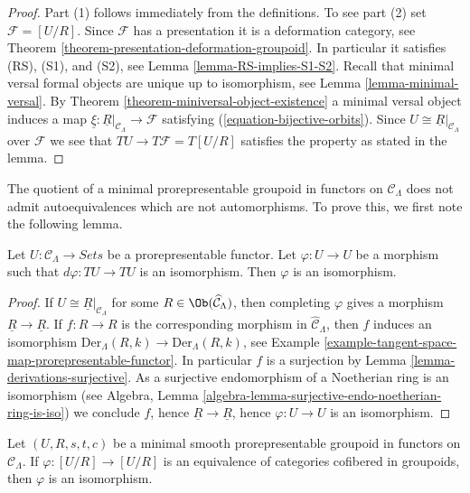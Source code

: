 \begin{proof}
Part (1) follows immediately from the definitions.
To see part (2) set $\mathcal{F} = [U/R]$. Since $\mathcal{F}$
has a presentation it is a deformation category, see
Theorem \ref{theorem-presentation-deformation-groupoid}.
In particular it satisfies (RS), (S1), and (S2), see
Lemma \ref{lemma-RS-implies-S1-S2}.
Recall that minimal versal formal objects are unique up to isomorphism, see
Lemma \ref{lemma-minimal-versal}.
By
Theorem \ref{theorem-miniversal-object-existence}
a minimal versal object induces a map
$\underline{\xi} : \underline{R}|_{\mathcal{C}_\Lambda} \to \mathcal{F}$
satisfying (\ref{equation-bijective-orbits}). Since
$U \cong \underline{R}|_{\mathcal{C}_\Lambda}$ over $\mathcal{F}$
we see that $TU \to T\mathcal{F} = T[U/R]$ satisfies the property
as stated in the lemma.
\end{proof}

\noindent
The quotient of a minimal prorepresentable groupoid in functors on $\mathcal
C_\Lambda$ does not admit autoequivalences which are not automorphisms.  To
prove this, we first note the following lemma.

\begin{lemma}
\label{lemma-surjective-morphism-prorepresentable-functor}
Let $U: \mathcal{C}_\Lambda \to \textit{Sets}$ be a
prorepresentable functor. Let $\varphi : U \to U$ be a morphism such
that $d\varphi : TU \to TU$ is an isomorphism.  Then $\varphi$ is an
isomorphism.
\end{lemma}

\begin{proof}
If $U \cong \underline{R}|_{\mathcal{C}_\Lambda}$ for some
$R \in \Ob(\widehat{\mathcal{C}}_\Lambda)$,
then completing $\varphi$ gives a morphism $\underline{R} \to \underline{R}$.
If $f: R \to R$ is the corresponding morphism in
$\widehat{\mathcal{C}}_\Lambda$, then $f$ induces an isomorphism
$\text{Der}_\Lambda(R, k) \to \text{Der}_\Lambda(R, k)$, see
Example \ref{example-tangent-space-map-prorepresentable-functor}.
In particular $f$ is a surjection by
Lemma \ref{lemma-derivations-surjective}.
As a surjective endomorphism of a Noetherian ring is an isomorphism (see
Algebra, Lemma \ref{algebra-lemma-surjective-endo-noetherian-ring-is-iso})
we conclude $f$, hence $\underline{R}
\to \underline{R}$, hence $\varphi : U \to U$
is an isomorphism.
\end{proof}

\begin{lemma}
\label{lemma-minimal-prorepresentable-groupoid-autoequivalence}
Let $(U, R, s, t, c)$ be a minimal smooth prorepresentable groupoid in
functors on $\mathcal{C}_\Lambda$. If $\varphi : [U/R] \to [U/R]$ is an
equivalence of categories cofibered in groupoids, then $\varphi$ is an
isomorphism.
\end{lemma}

